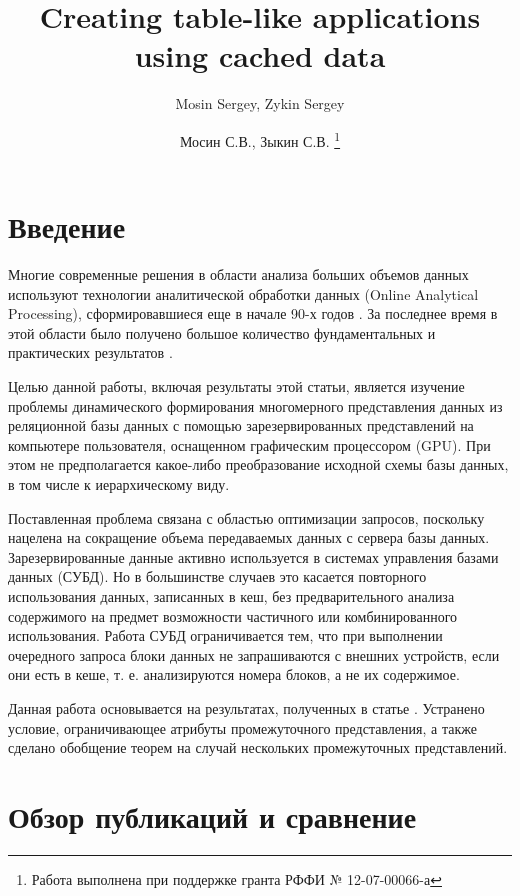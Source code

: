 \documentclass[10pt,a4paper]{article}
\author{Mosin Sergey, Zykin Sergey}
\title{Creating table-like applications using cached data}
\author{
Мосин С.В., Зыкин С.В. \footnote{Работа выполнена при поддержке гранта РФФИ №
12-07-00066-а}
}
\date{}
\begin{document}
\maketitle

\section{Введение}

Многие современные решения в области анализа больших объемов данных
используют технологии аналитической обработки данных (Online Analytical
Processing), сформировавшиеся еще в начале 90-х годов \cite{codd}. За последнее
время в этой области было получено большое количество фундаментальных
\cite{lecht,lehner,mazon} и практических результатов \cite{vassi, peder,
progressive, giorg}.

Целью данной работы, включая результаты этой статьи, является изучение
проблемы динамического формирования
многомерного представления данных из реляционной базы данных с
помощью зарезервированных представлений на компьютере пользователя, оснащенном
графическим процессором (GPU). При этом не предполагается какое-либо
преобразование исходной схемы базы данных, в том числе к иерархическому виду.

Поставленная проблема связана с областью оптимизации
запросов, поскольку нацелена на сокращение объема передаваемых данных с сервера
базы данных. Зарезервированные данные активно используется в системах управления
базами данных (СУБД). Но в большинстве случаев это касается повторного
использования данных, записанных в кеш, без предварительного анализа
содержимого на предмет возможности частичного или комбинированного
использования. Работа СУБД ограничивается тем, что при выполнении очередного
запроса блоки данных не запрашиваются с внешних устройств, если они есть в
кеше, т. е. анализируются номера блоков, а не их содержимое.

Данная работа основывается на результатах, полученных в
статье \cite{zyk_pol}. Устранено условие, ограничивающее атрибуты промежуточного
представления, а также сделано обобщение теорем на случай нескольких
промежуточных представлений.

\section{Обзор публикаций и сравнение}
\end{document}
